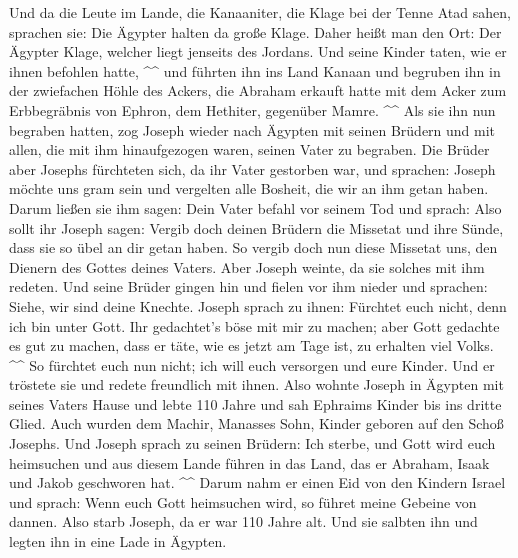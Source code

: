  Und da die Leute im Lande, die Kanaaniter, die Klage bei
der Tenne Atad sahen, sprachen sie: Die Ägypter halten da große Klage.
Daher heißt man den Ort: Der Ägypter Klage, welcher liegt jenseits des
Jordans.  Und seine Kinder taten, wie er ihnen befohlen
hatte, \^{}\^{}  und führten ihn ins Land Kanaan und
begruben ihn in der zwiefachen Höhle des Ackers, die Abraham erkauft
hatte mit dem Acker zum Erbbegräbnis von Ephron, dem Hethiter, gegenüber
Mamre. \^{}\^{}  Als sie ihn nun begraben hatten, zog
Joseph wieder nach Ägypten mit seinen Brüdern und mit allen, die mit ihm
hinaufgezogen waren, seinen Vater zu begraben.  Die
Brüder aber Josephs fürchteten sich, da ihr Vater gestorben war, und
sprachen: Joseph möchte uns gram sein und vergelten alle Bosheit, die
wir an ihm getan haben.  Darum ließen sie ihm sagen: Dein
Vater befahl vor seinem Tod und sprach:  Also sollt ihr
Joseph sagen: Vergib doch deinen Brüdern die Missetat und ihre Sünde,
dass sie so übel an dir getan haben. So vergib doch nun diese Missetat
uns, den Dienern des Gottes deines Vaters. Aber Joseph weinte, da sie
solches mit ihm redeten.  Und seine Brüder gingen hin und
fielen vor ihm nieder und sprachen: Siehe, wir sind deine Knechte.
 Joseph sprach zu ihnen: Fürchtet euch nicht, denn ich
bin unter Gott.  Ihr gedachtet's böse mit mir zu machen;
aber Gott gedachte es gut zu machen, dass er täte, wie es jetzt am Tage
ist, zu erhalten viel Volks. \^{}\^{}  So fürchtet euch
nun nicht; ich will euch versorgen und eure Kinder. Und er tröstete sie
und redete freundlich mit ihnen.  Also wohnte Joseph in
Ägypten mit seines Vaters Hause und lebte 110 Jahre  und
sah Ephraims Kinder bis ins dritte Glied. Auch wurden dem Machir,
Manasses Sohn, Kinder geboren auf den Schoß Josephs.  Und
Joseph sprach zu seinen Brüdern: Ich sterbe, und Gott wird euch
heimsuchen und aus diesem Lande führen in das Land, das er Abraham,
Isaak und Jakob geschworen hat. \^{}\^{}  Darum nahm er
einen Eid von den Kindern Israel und sprach: Wenn euch Gott heimsuchen
wird, so führet meine Gebeine von dannen.  Also starb
Joseph, da er war 110 Jahre alt. Und sie salbten ihn und legten ihn in
eine Lade in Ägypten.
